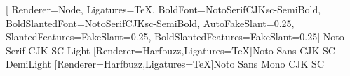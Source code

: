 

\setlength\parindent{0pt}

\setlrmarginsandblock{3cm}{2cm}{*}
\checkandfixthelayout

\raggedbottom

\OnehalfSpacing

[
 Renderer=Node,
 Ligatures=TeX,
 BoldFont={NotoSerifCJKsc-SemiBold},
 BoldSlantedFont={NotoSerifCJKsc-SemiBold},
 AutoFakeSlant=0.25,
 SlantedFeatures={FakeSlant=0.25},
 BoldSlantedFeatures={FakeSlant=0.25}]
 {Noto Serif CJK SC Light}
[Renderer=Harfbuzz,Ligatures=TeX]{Noto Sans CJK SC DemiLight}
[Renderer=Harfbuzz,Ligatures=TeX]{Noto Sans Mono CJK SC}

\makeatletter
\renewcommand{\@pnumwidth}{2em} 
\renewcommand{\@tocrmarg}{4em}
\makeatother
\renewcommand\cftbeforechapterskip{5pt plus 1pt}

\setlength{\columnsep}{.8em}
\setlength{\columnseprule}{0.1mm}

\renewcommand\stacktype{S}
\renewcommand\stackalignment{c}

\setheadfoot{14pt}{28pt}



